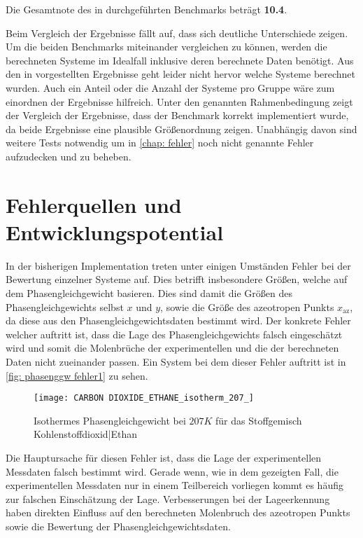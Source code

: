 \documentclass[../thesis.tex]{subfiles}
\begin{document}
Die Gesamtnote des in \cite{bibid} durchgeführten Benchmarks beträgt \textbf{10.4}.

Beim Vergleich der Ergebnisse fällt auf, dass sich deutliche Unterschiede zeigen. Um die beiden Benchmarks miteinander vergleichen zu können, werden die berechneten Systeme im Idealfall inklusive deren berechnete Daten benötigt. Aus den in \cite{bibid} vorgestellten Ergebnisse geht leider nicht hervor welche Systeme berechnet wurden. Auch ein Anteil oder die Anzahl der Systeme pro Gruppe wäre zum einordnen der Ergebnisse hilfreich. Unter den genannten Rahmenbedingung zeigt der Vergleich der Ergebnisse, dass der Benchmark korrekt implementiert wurde, da beide Ergebnisse eine plausible Größenordnung zeigen. Unabhängig davon sind weitere Tests notwendig um in \autoref{chap: fehler} noch nicht genannte Fehler aufzudecken und zu beheben.


\chapter{Fehlerquellen und Entwicklungspotential}
\label{chap: fehler}

In der bisherigen Implementation treten unter einigen Umständen Fehler bei der Bewertung einzelner Systeme auf. Dies betrifft insbesondere Größen, welche auf dem Phasengleichgewicht basieren. Dies sind damit die Größen des Phasengleichgewichts selbst $x$ und $y$, sowie die Größe des azeotropen Punkts $ x_\mathrm{az} $, da diese aus den Phasengleichgewichtsdaten bestimmt wird. Der konkrete Fehler welcher auftritt ist, dass die Lage des Phasengleichgewichts falsch eingeschätzt wird und somit die Molenbrüche der experimentellen und die der berechneten Daten nicht zueinander passen. Ein System bei dem dieser Fehler auftritt ist in \autoref{fig: phasenggw fehler1} zu sehen.

\begin{figure}[htb]
	\centering
	\texttt{[image: CARBON DIOXIDE\_ETHANE\_isotherm\_207\_]}
	\caption{Isothermes Phasengleichgewicht bei $ 207 K$ für das Stoffgemisch Kohlenstoffdioxid|Ethan}
	\label{fig: phasenggw fehler1}
\end{figure}

Die Hauptursache für diesen Fehler ist, dass die Lage der experimentellen Messdaten falsch bestimmt wird. Gerade wenn, wie in dem gezeigten Fall, die experimentellen Messdaten nur in einem Teilbereich vorliegen kommt es häufig zur falschen Einschätzung der Lage. Verbesserungen bei der Lageerkennung haben direkten Einfluss auf den berechneten Molenbruch des azeotropen Punkts sowie die Bewertung der Phasengleichgewichtsdaten.
\end{document}
